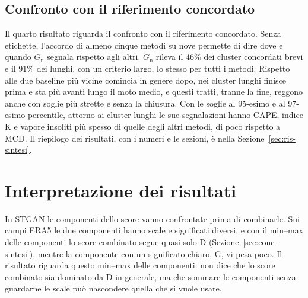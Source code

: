 \subsection{Confronto con il riferimento concordato}
Il quarto risultato riguarda il confronto con il riferimento concordato. Senza etichette, l'accordo di almeno cinque metodi su nove permette di dire dove e quando $G_{\mathrm{n}}$ segnala rispetto agli altri. $G_{\mathrm{n}}$ rileva il 46\% dei cluster concordati brevi e il 91\% dei lunghi, con un criterio largo, lo stesso per tutti i metodi. Rispetto alle due baseline più vicine comincia in genere dopo, nei cluster lunghi finisce prima e sta più avanti lungo il moto medio, e questi tratti, tranne la fine, reggono anche con soglie più strette e senza la chiusura. Con le soglie al 95-esimo e al 97-esimo percentile, attorno ai cluster lunghi le sue segnalazioni hanno CAPE, indice K e vapore insoliti più spesso di quelle degli altri metodi, di poco rispetto a MCD. Il riepilogo dei risultati, con i numeri e le sezioni, è nella Sezione~\ref{sec:ris-sintesi}.

\section{Interpretazione dei risultati}
\label{sec:conc-discussione}

In STGAN le componenti dello score vanno confrontate prima di combinarle. Sui campi ERA5 le due componenti hanno scale e significati diversi, e con il min--max delle componenti lo score combinato segue quasi solo D (Sezione~\ref{sec:conc-sintesi}), mentre la componente con un significato chiaro, G, vi pesa poco. Il risultato riguarda questo min--max delle componenti: non dice che lo score combinato sia dominato da D in generale, ma che sommare le componenti senza guardarne le scale può nascondere quella che si vuole usare.

